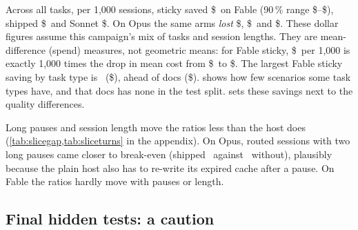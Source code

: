 \begin{table}[htbp]
\centering\small
\caption{Measured saving per 1,000 sessions (US dollars) by task type, host and arm, all splits. Ranges are in
\cref{tab:per1000full}.}
\label{tab:per1000}

\end{table}

Across all tasks, per 1,000 sessions, sticky saved \$\SavFableSticky\ on Fable (90\,\% range
\$\SavFableStickyLo--\$\SavFableStickyHi), shipped \$\SavFableShipped\ and Sonnet \$\SavFableSonnet. On Opus
the same arms \emph{lost} \$\SavOpusSticky, \$\SavOpusShipped\ and \$\SavOpusSonnet. These dollar figures
assume this campaign's mix of tasks and session lengths. They are mean-difference (spend) measures, not
geometric means: for Fable sticky, \$\SavFableSticky\ per 1,000 is exactly 1,000 times the drop in mean cost from
\$\RvSpendAnchor\ to \$\RvSpendSticky. The largest Fable sticky saving by task type is \RvBestTaskFableSticky\
(\$\RvSavReviewFableSticky), ahead of docs (\$\RvSavDocsFableSticky).  shows how few
scenarios some task types have, and that docs has none in the test split. \Cref{tab:jointtask} sets these savings
next to the quality differences.

\begin{table}[htbp]
\centering\small
\caption{Scenarios by task type and preregistered split. The split was stratified by family and pause pattern, not
by task type.}
\label{tab:tasksplit}

\end{table}

Long pauses and session length move the ratios less than the host does (\cref{tab:slicegap,tab:sliceturns}
in the appendix). On Opus, routed sessions with two long pauses came closer to break-even (shipped
\GapOpusShippedYes\X\ against \GapOpusShippedNo\X\ without), plausibly because the plain host also has to
re-write its expired cache after a pause. On Fable the ratios hardly move with pauses or length.

\subsection{Final hidden tests: a caution}\label{sec:finalpass}

\begin{table}[htbp]
\centering\small
\caption{Final hidden-test pass rate by arm, against the plain host on the same pairs, all splits. McNemar's
test compares the scenarios only the anchor passed with those only the arm passed.}
\label{tab:passrates}

\end{table}

